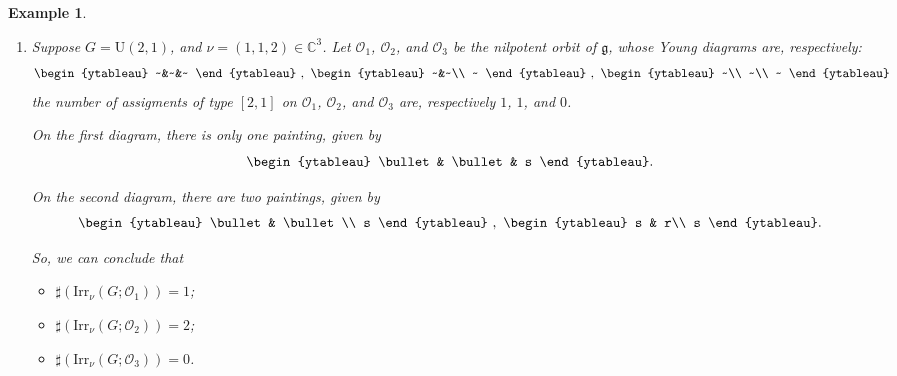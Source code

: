 \documentclass[12pt, a4paper]{amsart}
\numberwithin{equation}{section}
\newtheorem{examp}[thm]{Example}
\newcommand{\BC}{{\mathbb {C}}}
\newcommand{\CO}{{\mathcal {O}}}
\newcommand{\fg}{\mathfrak{g}}
\newcommand{\U}{{\mathrm{U}}}
\newcommand{\Irr}{{\mathrm{Irr}}}
\begin{document}
\begin{examp}
    \begin{enumerate}
        \item Suppose $G = \U(2,1)$, and $\nu = (1,1,2) \in \BC^3$. Let $\CO_1$, $\CO_2$, and $\CO_3$ be the nilpotent orbit of $\fg$, whose Young diagrams are, respectively:
            \[
                \begin{ytableau}
                    ~&~&~
                \end{ytableau}
            ~,~
                \begin{ytableau}
                    ~&~\\
                    ~
                \end{ytableau}
            ~,~
                \begin{ytableau}
                    ~\\
                    ~\\
                    ~
                \end{ytableau}
            \]
            the number of assigments of type $[2,1]$ on $\CO_1$, $\CO_2$, and $\CO_3$ are, respectively $1$, $1$, and $0$.

            On the first diagram, there is only one painting, given by
            \[
                \begin{ytableau}
                    \bullet & \bullet & s
                \end{ytableau}.
            \]

            On the second diagram, there are two paintings, given by
            \[
            \begin{ytableau}
                \bullet & \bullet\\
                s    
            \end{ytableau}
            ~,~
            \begin{ytableau}
                s & r\\
                s
            \end{ytableau}.
            \]
            
            So, we can conclude that 
            \begin{itemize}
                \item $\sharp(\Irr_{\nu}(G;\CO_{1})) = 1$;
                \item $\sharp(\Irr_{\nu}(G;\CO_{2})) = 2$;
                \item $\sharp(\Irr_{\nu}(G;\CO_{3})) = 0$.
            \end{itemize}


\end{enumerate}
\end{examp}
\end{document}
